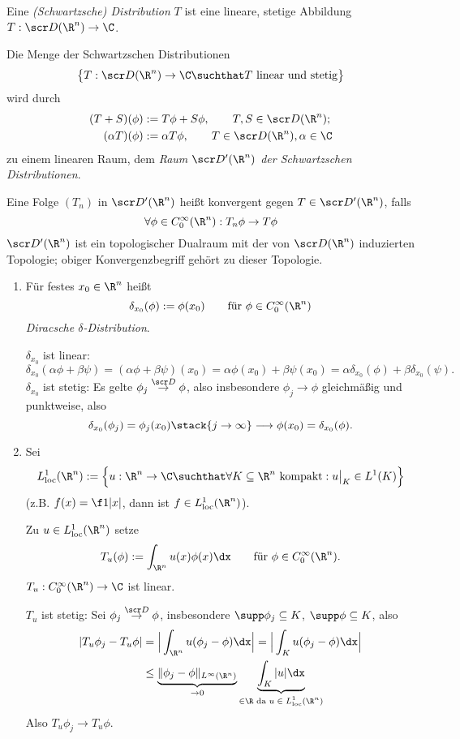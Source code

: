 \begin{df} \label{5.4}
	Eine \emph{(Schwartzsche) Distribution} $T$ ist eine lineare, stetige Abbildung $T: \scr D(\R^n) \to \C$.

	Die Menge der Schwartzschen Distributionen
	\[
		\big\{ T : \scr D(\R^n) \to \C \suchthat \text{$T$ linear und stetig} \big\}
	\]
	wird durch
	\begin{align*}
		(T+S)(\phi) &:= T\phi + S\phi,  \qquad T,S \in \scr D(\R^n);\\
		(\alpha T)(\phi) &:= \alpha T\phi,  \qquad T\in \scr D(\R^n), \alpha \in \C
	\end{align*}
	zu einem linearen Raum, dem \emph{Raum $\scr D'(\R^n)$ der Schwartzschen Distributionen}.

	Eine Folge $(T_n)$ in $\scr D'(\R^n)$ heißt konvergent gegen $T \in \scr D'(\R^n)$, falls
	\[
		\forall \phi \in C_0^\infty(\R^n) : T_n\phi \to T \phi
	\]
	$\scr D'(\R^n)$ ist ein topologischer Dualraum mit der von $\scr D(\R^n)$ induzierten Topologie; 
	obiger Konvergenzbegriff gehört zu dieser Topologie.
\end{df}


\begin{ex} \label{5.5}
	\begin{enumerate}[1)]
		\item
			Für festes $x_0 \in \R^n$ heißt
			\[
				\delta_{x_0}(\phi) := \phi(x_0) \qquad \text{für $\phi \in C_0^\infty(\R^n)$}
			\]
			\emph{Diracsche $\delta$-Distribution}.

			$\delta_{x_0}$ ist linear:
			\[
				\delta_{x_0}(\alpha \phi + \beta \psi) 
				= (\alpha \phi + \beta \psi)(x_0)
				= \alpha \phi(x_0) + \beta \psi(x_0)
				= \alpha \delta_{x_0}(\phi) + \beta \delta_{x_0}(\psi).
			\]
			$\delta_{x_0}$ ist stetig: Es gelte $\phi_j \overset{\scr D}\to \phi$, also insbesondere $\phi_j \to \phi$ gleichmäßig und punktweise, also
			\[
				\delta_{x_0}(\phi_j) = \phi_j(x_0) \stack{j\to \infty}\longrightarrow  \phi(x_0) = \delta_{x_0}(\phi).
			\]
		\item
			Sei
			\[
				L_{\text{loc}}^1 (\R^n) := \Big\{ u : \R^n \to \C  \suchthat \forall K \subset \R^n  \text{ kompakt} : u\big|_K \in L^1(K) \Big\}
			\]
			(z.B. $f(x) = \f 1{|x|}$, dann ist $f \in L_{\text{loc}}^1(\R^n)$).

			Zu $u \in L_{\text{loc}}^1(\R^n)$ setze
			\[
				T_u(\phi) := \int_{\R^n} u(x) \phi(x) \dx \qquad \text{für $\phi \in C_0^\infty(\R^n)$}.
			\]
			$T_u : C_0^\infty(\R^n) \to \C$ ist linear.

			$T_u$ ist stetig:
			Sei $\phi_j \overset{\scr D}{\to} \phi$, insbesondere $\supp \phi_j \subset K$, $\supp \phi \subset K$, also
			\begin{align*}
				|T_u \phi_j - T_u \phi| 
				&= \Big| \int_{\R^n} u (\phi_j-\phi) \dx \Big|
				= \Big| \int_{K} u (\phi_j-\phi) \dx \Big| \\
				&\le \underbrace{\|\phi_j - \phi\|_{L^\infty(\R^n)}}_{\to 0} \underbrace{\int_{K} |u| \dx}_{\in \R \text{ da $u\in L_{\text{loc}}^1(\R^n)$}}
			\end{align*}
			Also $T_u \phi_j \to T_u \phi$.
	\end{enumerate}
\end{ex}


